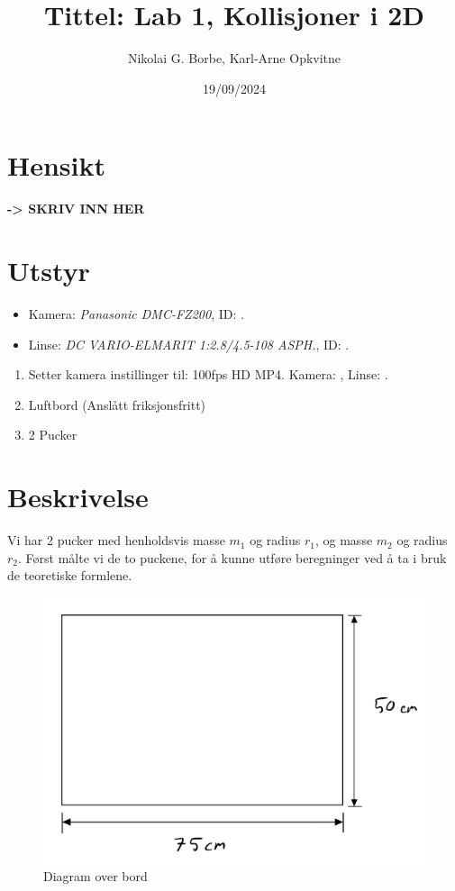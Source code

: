 \documentclass{article}
\title{Tittel: Lab 1, Kollisjoner i 2D}
\date{19/09/2024}
\author{Nikolai G. Borbe, Karl-Arne Opkvitne}
\begin{document}
\maketitle

\section*{Hensikt}
\textbf{-> SKRIV INN HER}

\section*{Utstyr}
\begin{itemize}
    \item Kamera: \textit{Panasonic DMC-FZ200}, ID: .
    \item Linse: \textit{DC VARIO-ELMARIT 1:2.8/4.5-108 ASPH.}, ID: .
\end{itemize}

\begin{enumerate}
    \item Setter kamera instillinger til: 100fps HD MP4. Kamera: , Linse: .
    \item Luftbord (Anslått friksjonsfritt)
    \item 2 Pucker
\end{enumerate}

\section*{Beskrivelse}
Vi har 2 pucker med henholdsvis masse $m_1$ og radius $r_1$, og masse $m_2$ og radius $r_2$. Først målte vi de to puckene, for å kunne utføre beregninger ved å ta i bruk de teoretiske formlene.

\begin{figure}[h!]
    \centering
    \includegraphics[width=\textwidth]{./images/bord.jpg}
    \caption{Diagram over bord}
\end{figure}
\end{document}
